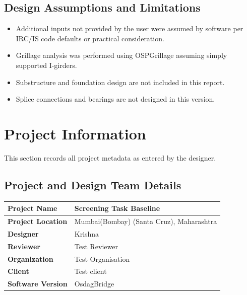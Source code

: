 \documentclass[12pt,a4paper]{report}
\numberwithin{table}{chapter}
\numberwithin{figure}{chapter}
\begin{document}
\section*{Design Assumptions and Limitations}
\label{sec:assumptions}

\begin{itemize}
\item Additional inputs not provided by the user were assumed by software per IRC/IS code defaults or practical consideration.
\item Grillage analysis was performed using OSPGrillage assuming simply supported I-girders.
\item Substructure and foundation design are not included in this report.
\item Splice connections and bearings are not designed in this version.
\end{itemize}

\titleformat{\chapter}[block]{\normalfont\Large\bfseries\centering}{\thechapter}{1em}{}
\titlespacing*{\chapter}{0pt}{-30pt}{10pt}


\chapter{Project Information}

This section records all project metadata as entered by the designer.

\section{Project and Design Team Details}
\label{sec:project-details}

\begin{tabular}{|L{5.5cm}|L{8.5cm}|}
\hline
\textbf{Project Name} & Screening Task Baseline \\
\hline
\textbf{Project Location} & Mumbai(Bombay) (Santa Cruz), Maharashtra \\
\hline
\textbf{Designer} & Krishna \\
\hline
\textbf{Reviewer} & Test Reviewer \\
\hline
\textbf{Organization} & Test Organisation \\
\hline
\textbf{Client} & Test client \\
\hline
\textbf{Software Version} & OsdagBridge \\
\hline
\end{tabular}
\end{document}

